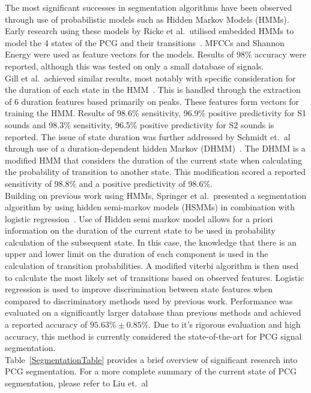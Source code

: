 \documentclass[titlepage, 12pt]{scrartcl} \usepackage{enumitem}
\begin{document}
The most significant successes in segmentation algorithms have been observed through use
of probabilistic models such as Hidden Markov Models (HMMs). Early research
using these models by Ricke et al.\ utilised embedded HMMs to model the 4
states of the PCG and their transitions~\parencite{Ricke2005}. MFCCs and
Shannon Energy were used as feature vectors for the models. Results of
98\% accuracy were reported, although this was tested on only a small database
of signals.\\
Gill et al.\ achieved similar results, most notably with specific consideration
for the duration of each state in the HMM~\parencite{Gill2005}. This is
handled through the extraction of 6 duration features based primarily on peaks.
These features form vectors for training the HMM. Results of 98.6\%
sensitivity, 96.9\% positive predictivity for S1 sounds and 98.3\% sensitivity,
96.5\% positive predictivity for S2 sounds is reported.
The issue of state duration was further addressed by Schmidt et.\ al through use
of a duration-dependent hidden Markov (DHMM)~\parencite{Schmidt2015}. The
DHMM is a modified HMM that considers the duration of the current state when
calculating the probability of transition to another state. This modification
scored a reported sensitivity of 98.8\% and a positive predictivity of
98.6\%.\\
Building on previous work using HMMs, Springer et al.\ presented a segmentation
algorithm by using hidden semi-markov models (HSMMs) in combination with
logistic regression~\parencite{Springer2016}. Use of Hidden semi markov model
allows for a priori information on the duration of the current state to be used
in probability calculation of the subsequent state. In this case, the knowledge
that there is an upper and lower limit on the duration of each component is
used in the calculation of transition probabilities.  A modified viterbi algorithm
is then used to calculate the most likely set of transitions based on observed
features. Logistic regression is used to improve discrimination between state
features when compared to discriminatory methods used by previous work.
Performance was evaluated on a significantly larger database than previous
methods and achieved a reported accuracy of $95.63\% \pm 0.85\%$. Due to it's
rigorous evaluation and high accuracy, this method is currently considered the
state-of-the-art for PCG signal segmentation.\\

Table~\ref{SegmentationTable} provides a brief overview of significant research
into PCG segmentation. For a more complete summary of the current state of PCG
segmentation, please refer to Liu et.\ al~\parencite{Liu2016}
\end{document}
